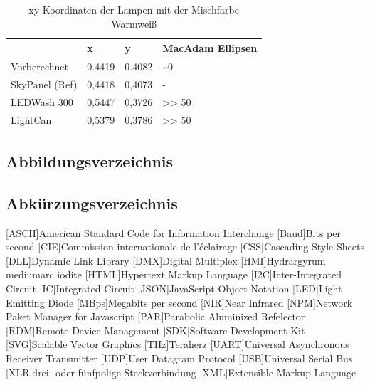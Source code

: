 \documentclass[11pt]{scrartcl}
\begin{document}
\noindent
\begin{table}[H]
    \begin{tabularx}{\textwidth}{|X|X|X|X|}
        \hline           & x        & y        & MacAdam Ellipsen\\\hline
        Vorberechnet     & 0.4419   & 0.4082   & \textasciitilde 0\\\hline
        SkyPanel (Ref)   & 0,4418   & 0,4073   & -\\\hline
        LEDWash 300      & 0,5447   & 0,3726   & >> 50\\\hline
        LightCan         & 0,5379   & 0,3786   & >> 50\\\hline
    \end{tabularx}
    \caption{xy Koordinaten der Lampen mit der Mischfarbe Warmweiß}
\end{table}
\clearpage

\subsection{Abbildungsverzeichnis}
\begingroup
\renewcommand{\section}[2]{}
\listoffigures
\endgroup
\clearpage

\subsection{Abkürzungsverzeichnis}
\begin{acronym}
    [ASCII]{American Standard Code for Information Interchange}
    [Baud]{Bits per second}
    [CIE]{Commission internationale de l’éclairage}
    [CSS]{Cascading Style Sheets}
    [DLL]{Dynamic Link Library}
    [DMX]{Digital Multiplex}
    [HMI]{Hydrargyrum mediumarc iodite}
    [HTML]{Hypertext Markup Language}
    [I2C]{Inter-Integrated Circuit}
    [IC]{Integrated Circuit}
    [JSON]{JavaScript Object Notation}
    [LED]{Light Emitting Diode}
    [MBps]{Megabits per second}
    [NIR]{Near Infrared}
    [NPM]{Network Paket Manager for Javascript}
    [PAR]{Parabolic Aluminized Refelector}
    [RDM]{Remote Device Management}
    [SDK]{Software Development Kit}
    [SVG]{Scalable Vector Graphics}
    [THz]{Teraherz}
    [UART]{Universal Asynchronous Receiver Transmitter}
    [UDP]{User Datagram Protocol}
    [USB]{Universal Serial Bus}
    [XLR]{drei- oder fünfpolige Steckverbindung}
    [XML]{Extensible Markup Language}
\end{acronym}
\clearpage
\end{document}
